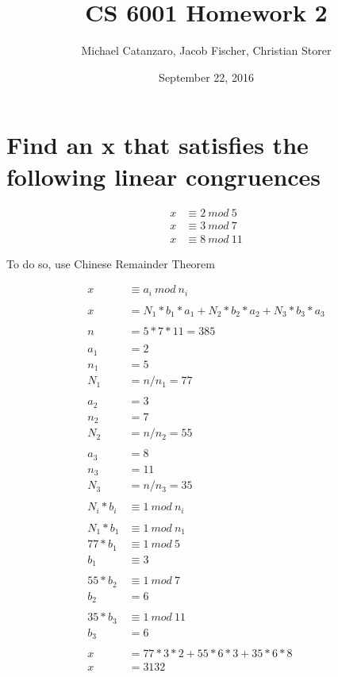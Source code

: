 \documentclass[letterpaper]{article}
\title{CS 6001 Homework 2}
\author{Michael Catanzaro, Jacob Fischer, Christian Storer}
\date{September 22, 2016}
\begin{document}
\maketitle

\section{Find an x that satisfies the following linear congruences}

\begin{equation*}
  \begin{split}
    x &\equiv 2\ mod\ 5 \\
	  x &\equiv 3\ mod\ 7 \\
    x &\equiv 8\ mod\ 11
  \end{split}
\end{equation*}

To do so, use Chinese Remainder Theorem

\begin{equation*}
  \begin{split}
    x &\equiv a_i\ mod\ n_i \\
    \\
    x &= N_1*b_1*a_1 + N_2*b_2*a_2 + N_3*b_3*a_3 \\
    \\
    n &= 5 * 7 * 11 = 385 \\
    \\
    a_1 &= 2 \\
    n_1 &= 5 \\
    N_1 &= n/n_1 = 77 \\
    \\
    a_2 &= 3 \\
    n_2 &= 7 \\ 
    N_2 &= n/n_2 = 55 \\
    \\
    a_3 &= 8 \\
    n_3 &= 11 \\
    N_3 &= n/n_3 = 35 \\
    \\
    N_i*b_i &\equiv 1\ mod\ n_i \\
    \\
    N_1*b_1 &\equiv 1\ mod\ n_1 \\
    77*b_1 &\equiv 1\ mod\ 5 \\
    b_1 &\equiv 3 \\
    \\
    55*b_2 &\equiv 1\ mod\ 7 \\
    b_2 &= 6 \\
    \\
    35*b_3 &\equiv 1\ mod\ 11 \\
    b_3 &= 6 \\
    \\
    x &= 77*3*2 + 55*6*3 + 35*6*8 \\
    x &= 3132
  \end{split}
\end{equation*}
\end{document}
